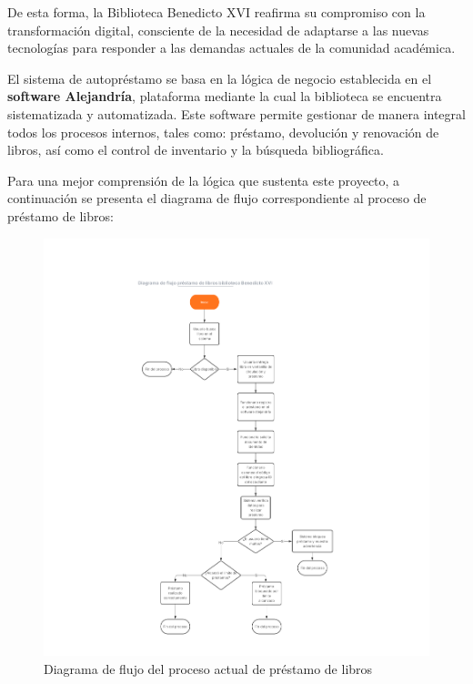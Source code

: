 \documentclass[spanish]{ieee_upb}
\begin{document}
De esta forma, la Biblioteca Benedicto XVI reafirma su compromiso con la transformación digital, consciente de la necesidad de adaptarse a las nuevas tecnologías para responder a las demandas actuales de la comunidad académica.\vspace{0.3 cm}

El sistema de autopréstamo se basa en la lógica de negocio establecida en el \textbf{software Alejandría}, plataforma mediante la cual la biblioteca se encuentra sistematizada y automatizada. Este software permite gestionar de manera integral todos los procesos internos, tales como: préstamo, devolución y renovación de libros, así como el control de inventario y la búsqueda bibliográfica.\vspace{0.3 cm}

Para una mejor comprensión de la lógica que sustenta este proyecto, a continuación se presenta el diagrama de flujo correspondiente al proceso de préstamo de libros:\vspace{0.3 cm}

\begin{figure}[H]
    \centering
    \includegraphics[width=0.9\linewidth]{img/DFpasosPrestamo.png}
    \caption[Préstamo de libros biblioteca Benedicto XVI]{Diagrama de flujo del proceso actual de préstamo de libros}
    \label{fig:presupuesto}
\end{figure}
\end{document}
